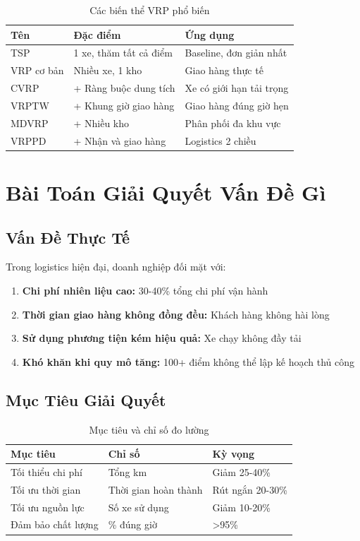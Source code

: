 \documentclass[12pt,a4paper,openany,oneside]{report}
\begin{document}
\begin{table}[h]
\centering
\caption{Các biến thể VRP phổ biến}
\begin{tabular}{@{}lll@{}}
\toprule
\textbf{Tên} & \textbf{Đặc điểm} & \textbf{Ứng dụng} \\
\midrule
TSP & 1 xe, thăm tất cả điểm & Baseline, đơn giản nhất \\
VRP cơ bản & Nhiều xe, 1 kho & Giao hàng thực tế \\
CVRP & + Ràng buộc dung tích & Xe có giới hạn tải trọng \\
VRPTW & + Khung giờ giao hàng & Giao hàng đúng giờ hẹn \\
MDVRP & + Nhiều kho & Phân phối đa khu vực \\
VRPPD & + Nhận và giao hàng & Logistics 2 chiều \\
\bottomrule
\end{tabular}
\end{table}

\chapter{Bài Toán Giải Quyết Vấn Đề Gì}

\section{Vấn Đề Thực Tế}

Trong logistics hiện đại, doanh nghiệp đối mặt với:
\begin{enumerate}
    \item \textbf{Chi phí nhiên liệu cao:} 30-40\% tổng chi phí vận hành
    \item \textbf{Thời gian giao hàng không đồng đều:} Khách hàng không hài lòng
    \item \textbf{Sử dụng phương tiện kém hiệu quả:} Xe chạy không đầy tải
    \item \textbf{Khó khăn khi quy mô tăng:} 100+ điểm không thể lập kế hoạch thủ công
\end{enumerate}

\section{Mục Tiêu Giải Quyết}

\begin{table}[h]
\centering
\caption{Mục tiêu và chỉ số đo lường}
\begin{tabular}{@{}lll@{}}
\toprule
\textbf{Mục tiêu} & \textbf{Chỉ số} & \textbf{Kỳ vọng} \\
\midrule
Tối thiểu chi phí & Tổng km & Giảm 25-40\% \\
Tối ưu thời gian & Thời gian hoàn thành & Rút ngắn 20-30\% \\
Tối ưu nguồn lực & Số xe sử dụng & Giảm 10-20\% \\
Đảm bảo chất lượng & \% đúng giờ & >95\% \\
\bottomrule
\end{tabular}
\end{table}
\end{document}
